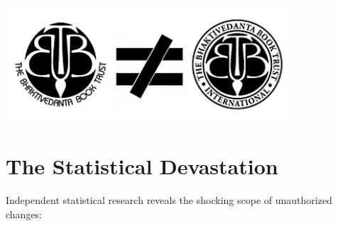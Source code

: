 \documentclass[11pt,twoside]{book}
\begin{document}
\vfill

\begin{center}
\includegraphics[width=0.8\textwidth]{bbti.png}
\end{center}
\vspace{0.5cm}
\section*{The Statistical Devastation}
\label{sec:org7de2663}

Independent statistical research reveals the shocking scope of unauthorized changes:
\end{document}
